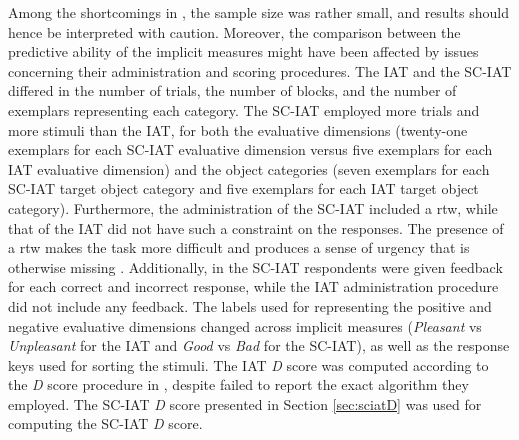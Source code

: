 \documentclass[12pt]{book}
\begin{document}
Among the shortcomings in , the sample size was rather small, and results should hence be interpreted with caution. Moreover, the comparison between the predictive ability of the implicit measures might have been affected by issues concerning their administration and scoring procedures. 
The IAT and the SC-IAT differed in the number of trials, the number of blocks, and the number of exemplars representing each category. 
The SC-IAT employed more trials and more stimuli than the IAT, for both the evaluative dimensions (twenty-one exemplars for each SC-IAT evaluative dimension versus five exemplars for each IAT evaluative dimension) and the object categories (seven exemplars for each SC-IAT target object category and five exemplars for each IAT target object category). 
Furthermore, the administration of the SC-IAT included a rtw, while that of the IAT did not have such a constraint on the responses. The presence of a rtw makes the task more difficult and produces a sense of urgency that is otherwise missing \cite{karpinski2006}. 
Additionally, in the SC-IAT respondents were given feedback for each correct and incorrect response, while the IAT administration procedure did not include any feedback. 
The labels used for representing the positive and negative evaluative dimensions changed across implicit measures (\emph{Pleasant} vs \emph{Unpleasant} for the IAT and \emph{Good} vs \emph{Bad} for the SC-IAT), as well as the response keys used for sorting the stimuli.  The IAT \emph{D} score was computed according to the \emph{D} score procedure in , despite  failed to report the exact algorithm they employed. The SC-IAT \emph{D} score presented in Section \ref{sec:sciatD} was used for computing the SC-IAT \emph{D} score.
\end{document}
